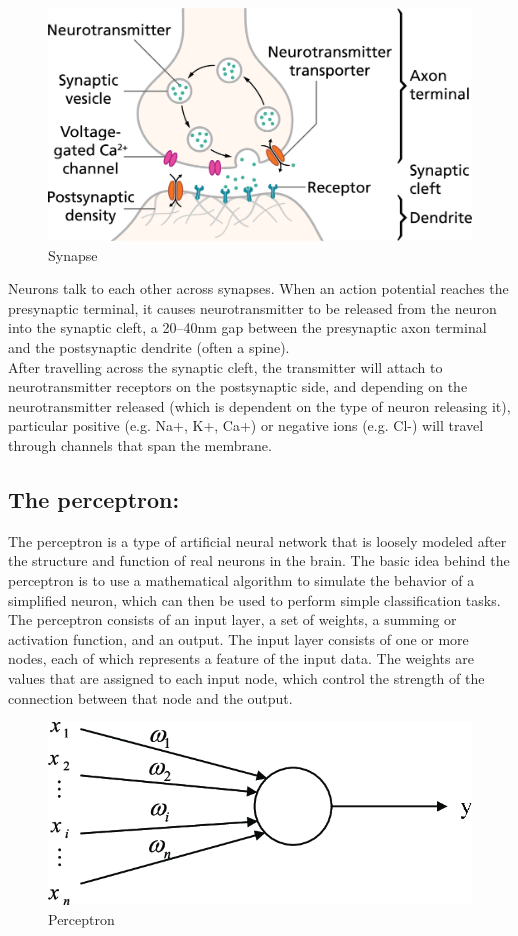 \documentclass[12pt]{article}
\begin{document}
\begin{figure}[h]
  \centering
  \includegraphics[scale = 0.19]{Synapse.jpg}
  \caption{Synapse}
\end{figure}

Neurons talk to each other across synapses. When an action potential reaches the
presynaptic terminal, it causes neurotransmitter to be released from the neuron into the synaptic
cleft, a 20–40nm gap between the presynaptic axon terminal and the postsynaptic dendrite
(often a spine).\\
After travelling across the synaptic cleft, the transmitter will attach to neurotransmitter
receptors on the postsynaptic side, and depending on the neurotransmitter released
(which is dependent on the type of neuron releasing it), particular positive (e.g. Na+, K+, Ca+)
or negative ions (e.g. Cl-) will travel through channels that span the membrane.
\subsection{The perceptron:}
The perceptron is a type of artificial neural network that is loosely modeled after the structure
and function of real neurons in the brain. The basic idea behind the perceptron is to use a
mathematical algorithm to simulate the behavior of a simplified neuron, which can then be used to
perform simple classification tasks.\\
The perceptron consists of an input layer, a set of weights, a summing or activation function,
and an output.
The input layer consists of one or more nodes, each of which represents a feature of the input data.
The weights are values that are assigned to each input node, which control the strength of the
connection between that node and the output.
\begin{figure}[h]
  \centering
  \includegraphics[scale = 0.5]{perceptron.png}
  \caption{Perceptron}
\end{figure}
\end{document}
